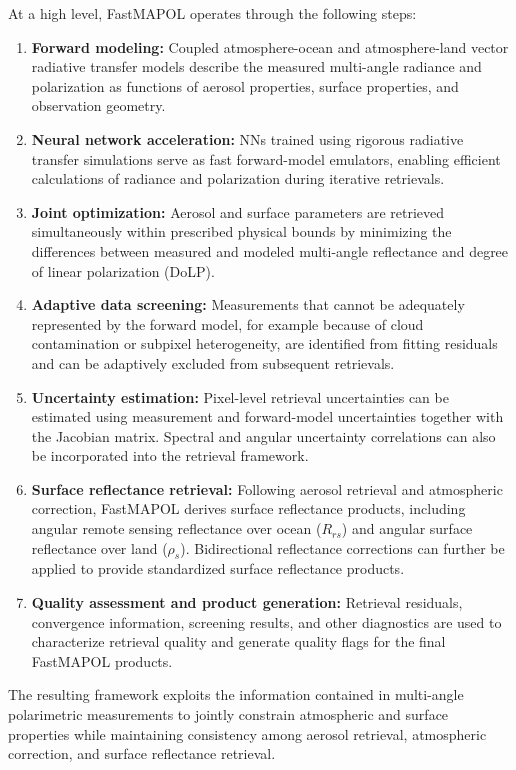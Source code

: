\documentclass[
  11pt,
  letterpaper,
]{scrreprt}
\begin{document}
At a high level, FastMAPOL operates through the following steps:

\begin{enumerate}
\def\labelenumi{\arabic{enumi}.}
\item
  \textbf{Forward modeling:} Coupled atmosphere-ocean and
  atmosphere-land vector radiative transfer models describe the measured
  multi-angle radiance and polarization as functions of aerosol
  properties, surface properties, and observation geometry.
\item
  \textbf{Neural network acceleration:} NNs trained using rigorous
  radiative transfer simulations serve as fast forward-model emulators,
  enabling efficient calculations of radiance and polarization during
  iterative retrievals.
\item
  \textbf{Joint optimization:} Aerosol and surface parameters are
  retrieved simultaneously within prescribed physical bounds by
  minimizing the differences between measured and modeled multi-angle
  reflectance and degree of linear polarization (DoLP).
\item
  \textbf{Adaptive data screening:} Measurements that cannot be
  adequately represented by the forward model, for example because of
  cloud contamination or subpixel heterogeneity, are identified from
  fitting residuals and can be adaptively excluded from subsequent
  retrievals.
\item
  \textbf{Uncertainty estimation:} Pixel-level retrieval uncertainties
  can be estimated using measurement and forward-model uncertainties
  together with the Jacobian matrix. Spectral and angular uncertainty
  correlations can also be incorporated into the retrieval framework.
\item
  \textbf{Surface reflectance retrieval:} Following aerosol retrieval
  and atmospheric correction, FastMAPOL derives surface reflectance
  products, including angular remote sensing reflectance over ocean
  (\(R_{rs}\)) and angular surface reflectance over land (\(\rho_s\)).
  Bidirectional reflectance corrections can further be applied to
  provide standardized surface reflectance products.
\item
  \textbf{Quality assessment and product generation:} Retrieval
  residuals, convergence information, screening results, and other
  diagnostics are used to characterize retrieval quality and generate
  quality flags for the final FastMAPOL products.
\end{enumerate}

The resulting framework exploits the information contained in
multi-angle polarimetric measurements to jointly constrain atmospheric
and surface properties while maintaining consistency among aerosol
retrieval, atmospheric correction, and surface reflectance retrieval.
\end{document}
